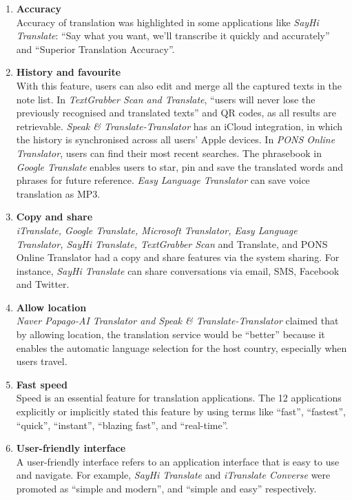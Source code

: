 \documentclass[english]{textolivre}
\begin{document}
\begin{enumerate}
    \item \textbf{Accuracy} \\
    Accuracy of translation was highlighted in some applications like \textit{SayHi Translate}: “Say what you want, we’ll transcribe it quickly and accurately” and “Superior Translation Accuracy”.
    \item \textbf{History and favourite} \\
    With this feature, users can also edit and merge all the captured texts in the note list. In \textit{TextGrabber Scan and Translate}, “users will never lose the previously recognised and translated texts” and QR codes, as all results are retrievable. \textit{Speak \& Translate-Translator} has an iCloud integration, in which the history is synchronised across all users’ Apple devices. In \textit{PONS Online Translator}, users can find their most recent searches. The phrasebook in \textit{Google Translate} enables users to star, pin and save the translated words and phrases for future reference. \textit{Easy Language Translator} can save voice translation as MP3.
    \item \textbf{Copy and share} \\
  \textit{  iTranslate, Google Translate, Microsoft Translator, Easy Language Translator, SayHi Translate, TextGrabber Scan} and Translate, and PONS Online Translator had a copy and share features via the system sharing. For instance, \textit{SayHi Translate} can share conversations via email, SMS, Facebook and Twitter.
    \item \textbf{Allow location} \\
    \textit{Naver Papago-AI Translator and Speak \& Translate-Translator} claimed that by allowing location, the translation service would be “better” because it enables the automatic language selection for the host country, especially when users travel.
    \item \textbf{Fast speed} \\
    Speed is an essential feature for translation applications. The 12 applications explicitly or implicitly stated this feature by using terms like “fast”, “fastest”, “quick”, “instant”, “blazing fast”, and “real-time”.
    \item \textbf{User-friendly interface} \\
    A user-friendly interface refers to an application interface that is easy to use and navigate. For example, \textit{SayHi Translate} and \textit{iTranslate Converse} were promoted as “simple and modern”, and “simple and easy” respectively.

\end{enumerate}
\end{document}
